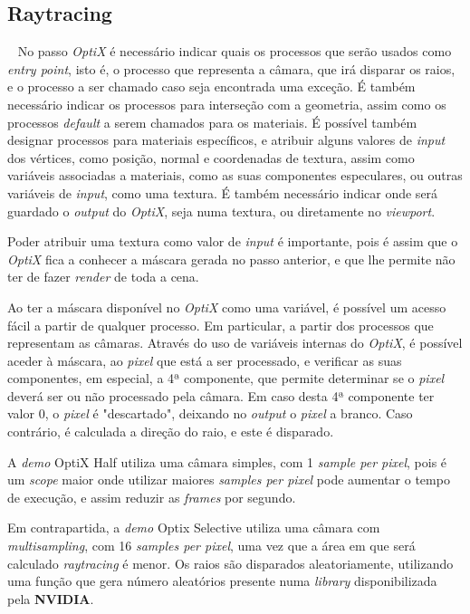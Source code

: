\documentclass[10pt]{article}
\begin{document}
\subsection{Raytracing}~
No passo \textit{OptiX} é necessário indicar quais os processos que serão usados como \textit{entry point}, isto é, o processo que representa a câmara, que irá disparar os raios, e o processo a ser chamado caso seja encontrada uma exceção. É também necessário indicar os processos para interseção com a geometria, assim como os processos \textit{default} a serem chamados para os materiais. É possível também designar processos para materiais específicos, e atribuir alguns valores de \textit{input} dos vértices, como posição, normal e coordenadas de textura, assim como variáveis associadas a materiais, como as suas componentes especulares, ou outras variáveis de \textit{input}, como uma textura. É também necessário indicar onde será guardado o \textit{output} do \textit{OptiX}, seja numa textura, ou diretamente no \textit{viewport}.

Poder atribuir uma textura como valor de \textit{input} é importante, pois é assim que o \textit{OptiX} fica a conhecer a máscara gerada no passo anterior, e que lhe permite não ter de fazer \textit{render} de toda a cena.

Ao ter a máscara disponível no \textit{OptiX} como uma variável, é possível um acesso fácil a partir de qualquer processo. Em particular, a partir dos processos que representam as câmaras. Através do uso de variáveis internas do \textit{OptiX}, é possível aceder à máscara, ao \textit{pixel} que está a ser processado, e verificar as suas componentes, em especial, a 4ª componente, que permite determinar se o \textit{pixel} deverá ser ou não processado pela câmara. Em caso desta 4ª componente ter valor 0, o \textit{pixel} é "descartado", deixando no \textit{output} o \textit{pixel} a branco. Caso contrário, é calculada a direção do raio, e este é disparado.

A \textit{demo} {OptiX Half} utiliza uma câmara simples, com 1 \textit{sample per pixel}, pois é um \textit{scope} maior onde utilizar maiores \textit{samples per pixel} pode aumentar o tempo de execução, e assim reduzir as \textit{frames} por segundo.

Em contrapartida, a \textit{demo} {Optix Selective} utiliza uma câmara com \textit{multisampling}, com 16 \textit{samples per pixel}, uma vez que a área em que será calculado \textit{raytracing} é menor. Os raios são disparados aleatoriamente, utilizando uma função que gera número aleatórios presente numa \textit{library} disponibilizada pela \textbf{NVIDIA}.
\end{document}
